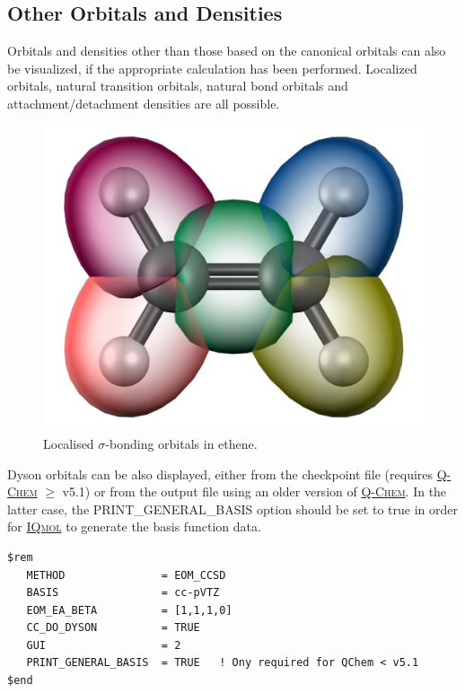 \documentclass[a4paper,12pt]{article}
\newcommand{\qchem}{\href{https://q-chem.com}{{\scshape Q-Chem}}}
\newcommand{\iqmol}{\href{https://www.iqmol.org}{{\scshape IQmol}}}
\begin{document}
\subsection{Other Orbitals and Densities}

Orbitals and densities other than those based on the canonical orbitals can
also be visualized, if the appropriate calculation has been performed.  Localized
orbitals, natural transition orbitals, natural bond orbitals and
attachment/detachment densities are all possible.

\begin{figure}[h]
\begin{center}
\includegraphics[scale=0.25]{figures/LocalizedBonds.png}
\caption{Localised $\sigma$-bonding orbitals in ethene.}
\label{fig:mo}
\end{center}
\end{figure}

Dyson orbitals can be also displayed, either from the checkpoint file (requires
\qchem{} $\ge$ v5.1) or from the output file using an older version of \qchem{}.
In the latter case, the PRINT\_GENERAL\_BASIS option should be set to true in
order for \iqmol{} to generate the basis function data.

{\small
\begin{verbatim}
$rem
   METHOD               = EOM_CCSD
   BASIS                = cc-pVTZ
   EOM_EA_BETA          = [1,1,1,0]
   CC_DO_DYSON          = TRUE
   GUI                  = 2
   PRINT_GENERAL_BASIS  = TRUE   ! Ony required for QChem < v5.1
$end
\end{verbatim}
}
\end{document}
